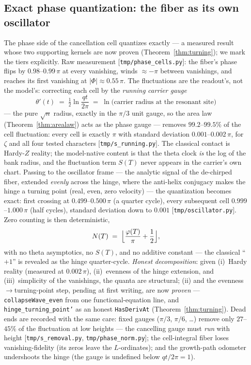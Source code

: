 \documentclass[11pt]{article}
\newcommand{\code}[1]{\texttt{#1}}
\begin{document}
\subsection{Exact phase quantization: the fiber as its own oscillator}\label{sub:phasequant}

The phase side of the cancellation cell quantizes exactly --- a measured result whose two
supporting kernels are now proven (Theorem~\ref{thm:turning}); we mark the tiers
explicitly.  Raw measurement [\code{tmp/phase\_cells.py}]: the fiber's phase flips by
$0.98$--$0.99\,\pi$ at every vanishing, winds $\approx-\pi$ between vanishings, and reaches its
first vanishing at $|\Phi|\approx0.55\,\pi$.  The fluctuations are the readout's, not the model's:
correcting each cell by the \emph{running carrier gauge}
\[
  \theta'(t)\;=\;\tfrac12\ln\!\frac{qt}{2\pi}\;=\;\ln\bigl(\text{carrier radius at the resonant
  site}\bigr)
\]
--- the pure $\sqrt n$ radius, exactly in the $\pi/3$ unit gauge, so the area law
(Theorem~\ref{thm:arealaw}) acts as the phase gauge --- removes $99.2$--$99.5\%$ of the cell
fluctuation: every cell is exactly $\pi$ with standard deviation $0.001$--$0.002\,\pi$, for $\zeta$
and all four tested characters [\code{tmp/s\_running.py}].  The classical contact is Hardy-$Z$
reality; the model-native content is that the theta clock \emph{is} the log of the bank radius,
and the fluctuation term $S(T)$ never appears in the carrier's own chart.  Passing to the
oscillator frame --- the analytic signal of the de-chirped fiber, extended \emph{evenly} across the
hinge, where the anti-helix conjugacy makes the hinge a turning point (real, even, zero velocity)
--- the quantization becomes exact: first crossing at $0.499$--$0.500\,\pi$ (a quarter cycle),
every subsequent cell $0.999$--$1.000\,\pi$ (half cycles), standard deviation down to $0.001$
[\code{tmp/oscillator.py}].  Zero counting is then deterministic,
\[
  N(T)\;=\;\Bigl\lfloor\frac{\varphi(T)}{\pi}+\frac12\Bigr\rfloor ,
\]
with no theta asymptotics, no $S(T)$, and no additive constant --- the classical ``$+1$'' is
revealed as the hinge quarter-cycle.  \emph{Honest decomposition}: given (i)~Hardy reality
(measured at $0.002\,\pi$), (ii)~evenness of the hinge extension, and (iii)~simplicity of the
vanishings, the quanta are structural; (ii) and the evenness$\to$turning-point step, pending at
first writing, are now \emph{proven} --- \code{collapseWave\_even} from one functional-equation
line, and \code{hinge\_turning\_point'} as an honest \code{HasDerivAt}
(Theorem~\ref{thm:turning}).  Dead ends are recorded with the
same care: fixed gauges ($\pi/3$, $\pi/6$, \dots) remove only $27$--$45\%$ of the fluctuation at
low heights --- the cancelling gauge must \emph{run} with height [\code{tmp/s\_removal.py},
\code{tmp/phase\_norm.py}]; the cell-integral fiber loses vanishing-fidelity (its zeros leave the
$L$-ordinates); and the growth-path odometer undershoots the hinge (the gauge is undefined below
$qt/2\pi=1$).
\end{document}
